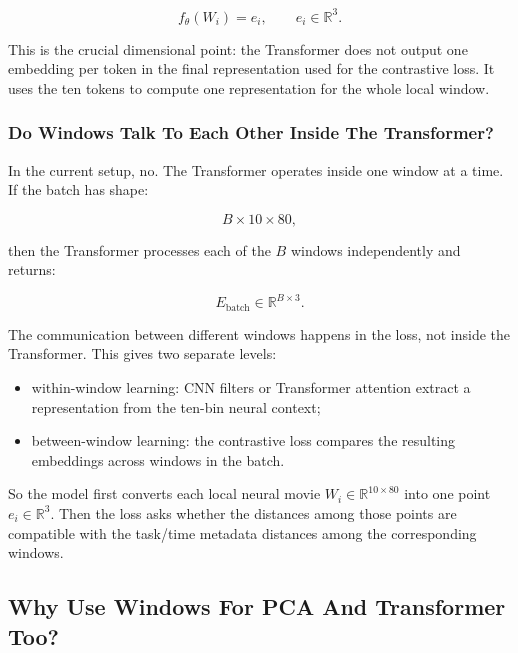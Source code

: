 \documentclass[11pt]{article}
\begin{document}
\begin{equation}
f_\theta(W_i) = e_i,
\qquad
e_i \in \mathbb{R}^{3}.
\end{equation}

This is the crucial dimensional point: the Transformer does not output one
embedding per token in the final representation used for the contrastive loss.
It uses the ten tokens to compute one representation for the whole local
window.

\subsubsection{Do Windows Talk To Each Other Inside The Transformer?}

In the current setup, no. The Transformer operates inside one window at a
time. If the batch has shape:

\begin{equation}
B \times 10 \times 80,
\end{equation}

then the Transformer processes each of the $B$ windows independently and
returns:

\begin{equation}
E_{\text{batch}} \in \mathbb{R}^{B \times 3}.
\end{equation}

The communication between different windows happens in the loss, not inside
the Transformer. This gives two separate levels:

\begin{itemize}
    \item within-window learning: CNN filters or Transformer attention extract
    a representation from the ten-bin neural context;
    \item between-window learning: the contrastive loss compares the resulting
    embeddings across windows in the batch.
\end{itemize}

So the model first converts each local neural movie
$W_i \in \mathbb{R}^{10 \times 80}$ into one point
$e_i \in \mathbb{R}^{3}$. Then the loss asks whether the distances among those
points are compatible with the task/time metadata distances among the
corresponding windows.

\subsection{Why Use Windows For PCA And Transformer Too?}
\end{document}

